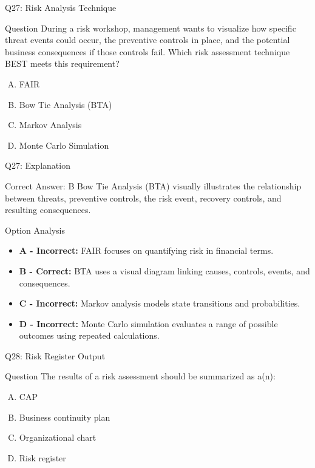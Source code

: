\documentclass{beamer}
\begin{document}
	
	\begin{frame}{Q27: Risk Analysis Technique} \begin{block}{Question} During a risk workshop, management wants to visualize how specific threat events could occur, the preventive controls in place, and the potential business consequences if those controls fail. Which risk assessment technique BEST meets this requirement? \end{block} \begin{enumerate}[(A)] \item FAIR \item Bow Tie Analysis (BTA) \item Markov Analysis \item Monte Carlo Simulation \end{enumerate} \end{frame} \begin{frame}{Q27: Explanation} \begin{block}{Correct Answer: B} Bow Tie Analysis (BTA) visually illustrates the relationship between threats, preventive controls, the risk event, recovery controls, and resulting consequences. \end{block} \begin{block}{Option Analysis} \begin{itemize} \item \textbf{A - Incorrect:} FAIR focuses on quantifying risk in financial terms. \item \textbf{B - Correct:} BTA uses a visual diagram linking causes, controls, events, and consequences. \item \textbf{C - Incorrect:} Markov analysis models state transitions and probabilities. \item \textbf{D - Incorrect:} Monte Carlo simulation evaluates a range of possible outcomes using repeated calculations. \end{itemize} \end{block} \end{frame}
	
	
	\begin{frame}{Q28: Risk Register Output}
		\begin{block}{Question}
			The results of a risk assessment should be summarized as a(n):
		\end{block}
		\begin{enumerate}[(A)]
			\item CAP
			\item Business continuity plan
			\item Organizational chart
			\item Risk register
		\end{enumerate}
	\end{frame}
	
\end{document}
